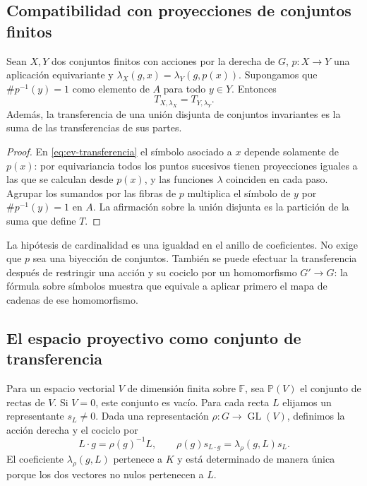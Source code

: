 \subsection{Compatibilidad con proyecciones de conjuntos finitos}

\begin{proposicion}
\label{prop:ev-fibras}
Sean $X,Y$ dos conjuntos finitos con acciones por la derecha de $G$, $p:X\to Y$ una aplicación equivariante y $\lambda_X(g,x)=\lambda_Y(g,p(x))$. Supongamos que $\#p^{-1}(y)=1$ como elemento de $A$ para todo $y\in Y$. Entonces
\begin{equation}
 T_{X,\lambda_X}=T_{Y,\lambda_Y}.
 \label{eq:ev-fibras}
\end{equation}
Además, la transferencia de una unión disjunta de conjuntos invariantes es la suma de las transferencias de sus partes.
\end{proposicion}
\begin{proof}
En \eqref{eq:ev-transferencia} el símbolo asociado a $x$ depende solamente de $p(x)$: por equivariancia todos los puntos sucesivos tienen proyecciones iguales a las que se calculan desde $p(x)$, y las funciones $\lambda$ coinciden en cada paso. Agrupar los sumandos por las fibras de $p$ multiplica el símbolo de $y$ por $\#p^{-1}(y)=1$ en $A$. La afirmación sobre la unión disjunta es la partición de la suma que define $T$.
\end{proof}

La hipótesis de cardinalidad es una igualdad en el anillo de coeficientes. No exige que $p$ sea una biyección de conjuntos. También se puede efectuar la transferencia después de restringir una acción y su cociclo por un homomorfismo $G'\to G$: la fórmula sobre símbolos muestra que equivale a aplicar primero el mapa de cadenas de ese homomorfismo.

\subsection{El espacio proyectivo como conjunto de transferencia}

Para un espacio vectorial $V$ de dimensión finita sobre $\mathbb F$, sea $\mathbb P(V)$ el conjunto de rectas de $V$. Si $V=0$, este conjunto es vacío. Para cada recta $L$ elijamos un representante $s_L\ne0$. Dada una representación $\rho:G\to\operatorname{GL}(V)$, definimos la acción derecha y el cociclo por
\begin{equation}
 L\cdot g=\rho(g)^{-1}L,\qquad
 \rho(g)s_{L\cdot g}=\lambda_\rho(g,L)s_L.
 \label{eq:ev-rectas}
\end{equation}
El coeficiente $\lambda_\rho(g,L)$ pertenece a $K$ y está determinado de manera única porque los dos vectores no nulos pertenecen a $L$.

